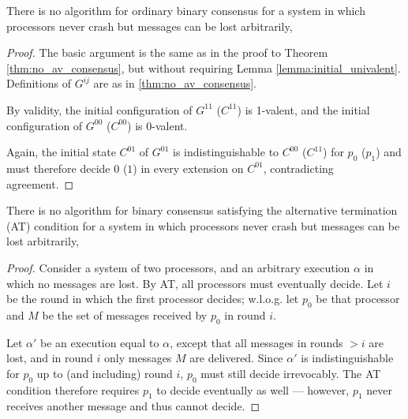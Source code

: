 \begin{theorem}
There is no algorithm for ordinary binary consensus
for a system in which processors never crash but messages can be
lost arbitrarily,
\end{theorem}

\begin{proof}
The basic argument is the same as in the proof to Theorem \ref{thm:no_av_consensus},
but without requiring Lemma \ref{lemma:initial_univalent}. Definitions of
$G^{ij}$ are as in \ref{thm:no_av_consensus}.

By validity, the initial configuration of
$G^{11}$ ($C^{11}$) is 1-valent, and the initial configuration
of $G^{00}$ ($C^{00}$) is 0-valent.

Again, the initial state $C^{01}$ of $G^{01}$ is indistinguishable to $C^{00}$
($C^{11}$) for $p_0$ ($p_1$) and must therefore decide $0$ ($1$) in every extension
on $C^{01}$, contradicting agreement.
\end{proof}

\begin{theorem}
There is no algorithm for binary consensus satisfying the alternative termination (AT)
condition for a system in which processors never crash but messages can be
lost arbitrarily,
\end{theorem}

\begin{proof}
Consider a system of two processors, and an arbitrary execution $\alpha$ in which
no messages are lost. By AT, all processors must eventually decide. Let $i$
be the round in which the first processor decides; w.l.o.g. let
$p_0$ be that processor and $M$ be the set of messages received by $p_0$ in
round $i$.

Let $\alpha'$ be an execution equal to $\alpha$, except that all messages
in rounds $> i$ are lost, and in round $i$ only messages $M$ are delivered.
Since $\alpha'$ is indistinguishable for $p_0$ up to (and including) round $i$,
$p_0$ must still decide irrevocably. The AT condition therefore requires $p_1$ to
decide eventually as well --- however, $p_1$ never receives another message
and thus cannot decide.
\end{proof}


